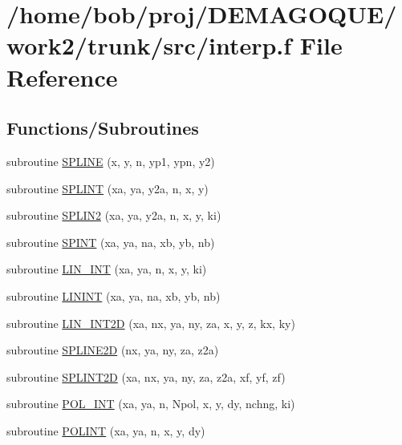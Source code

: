\hypertarget{interp_8f}{
\section{/home/bob/proj/DEMAGOQUE/work2/trunk/src/interp.f File Reference}
\label{interp_8f}
}
\subsection*{Functions/Subroutines}
\begin{DoxyCompactItemize}
\item 
subroutine \hyperlink{interp_8f_abdd2871e2a0a60f37b574156132f426e}{SPLINE} (x, y, n, yp1, ypn, y2)
\item 
subroutine \hyperlink{interp_8f_ac695724b79eba38b0ed89b0268254382}{SPLINT} (xa, ya, y2a, n, x, y)
\item 
subroutine \hyperlink{interp_8f_a6d2236727e8370221917db234bdb42d7}{SPLIN2} (xa, ya, y2a, n, x, y, ki)
\item 
subroutine \hyperlink{interp_8f_aab8bc44fbf2bc0a54fe1bede6c67e78c}{SPINT} (xa, ya, na, xb, yb, nb)
\item 
subroutine \hyperlink{interp_8f_a19542a5a1d6e24681eecb910e9fb52c4}{LIN\_\-INT} (xa, ya, n, x, y, ki)
\item 
subroutine \hyperlink{interp_8f_a96fbad33968d82463f23d2c190c88f11}{LININT} (xa, ya, na, xb, yb, nb)
\item 
subroutine \hyperlink{interp_8f_aa99dd4561dd3b8f55a705bd59376667b}{LIN\_\-INT2D} (xa, nx, ya, ny, za, x, y, z, kx, ky)
\item 
subroutine \hyperlink{interp_8f_ae9e51899edbd82115b64a0df7c7fa0ae}{SPLINE2D} (nx, ya, ny, za, z2a)
\item 
subroutine \hyperlink{interp_8f_ab74c654ddadc3450859b976c50103b84}{SPLINT2D} (xa, nx, ya, ny, za, z2a, xf, yf, zf)
\item 
subroutine \hyperlink{interp_8f_a03815de6282880a4a0126771609fe1e6}{POL\_\-INT} (xa, ya, n, Npol, x, y, dy, nchng, ki)
\item 
subroutine \hyperlink{interp_8f_ad96c0747e78d542397c8834eab85465d}{POLINT} (xa, ya, n, x, y, dy)
\end{DoxyCompactItemize}


